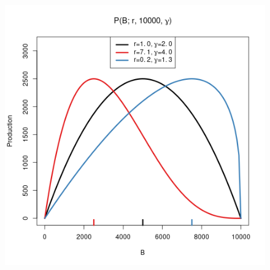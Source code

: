 \documentclass[12pt]{article}
\begin{document}

\begin{figure}[h!]
\begin{minipage}[h!]{0.349\textwidth}
\hspace*{-1cm}
\includegraphics[width=1.05\textwidth]{./plots/srr1.1.png}
\end{minipage}
\begin{minipage}[h!]{0.349\textwidth}
\hspace*{-1cm}

\end{minipage}
\end{figure}
\end{document}
